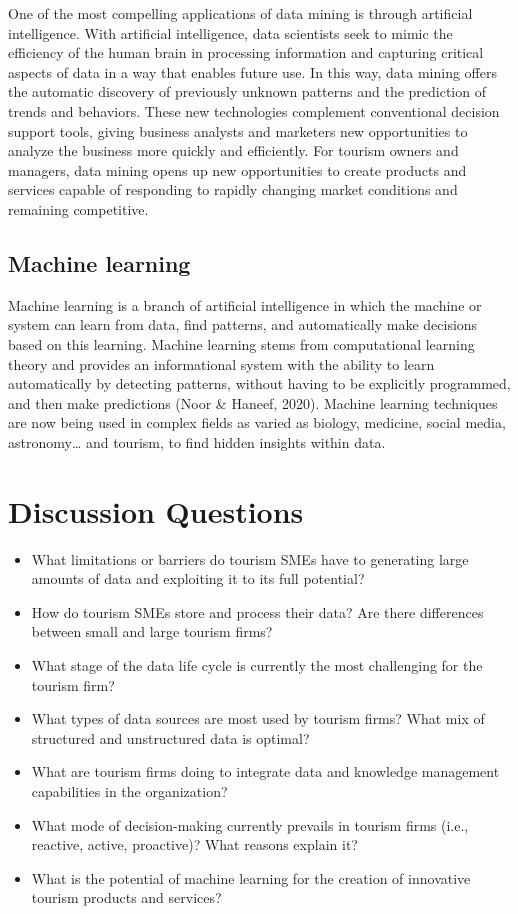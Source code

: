 \documentclass[
  letterpaper,
  DIV=11,
  numbers=noendperiod]{scrreprt}
\begin{document}
One of the most compelling applications of data mining is through
artificial intelligence. With artificial intelligence, data scientists
seek to mimic the efficiency of the human brain in processing
information and capturing critical aspects of data in a way that enables
future use. In this way, data mining offers the automatic discovery of
previously unknown patterns and the prediction of trends and behaviors.
These new technologies complement conventional decision support tools,
giving business analysts and marketers new opportunities to analyze the
business more quickly and efficiently. For tourism owners and managers,
data mining opens up new opportunities to create products and services
capable of responding to rapidly changing market conditions and
remaining competitive.

\hypertarget{machine-learning}{%
\subsection{Machine learning}\label{machine-learning}}

Machine learning is a branch of artificial intelligence in which the
machine or system can learn from data, find patterns, and automatically
make decisions based on this learning. Machine learning stems from
computational learning theory and provides an informational system with
the ability to learn automatically by detecting patterns, without having
to be explicitly programmed, and then make predictions (Noor \& Haneef,
2020). Machine learning techniques are now being used in complex fields
as varied as biology, medicine, social media, astronomy\ldots{} and
tourism, to find hidden insights within data.

\hypertarget{discussion-questions-4}{%
\section{Discussion Questions}\label{discussion-questions-4}}

\begin{itemize}
\item
  What limitations or barriers do tourism SMEs have to generating large
  amounts of data and exploiting it to its full potential?
\item
  How do tourism SMEs store and process their data? Are there
  differences between small and large tourism firms?
\item
  What stage of the data life cycle is currently the most challenging
  for the tourism firm?
\item
  What types of data sources are most used by tourism firms? What mix of
  structured and unstructured data is optimal?
\item
  What are tourism firms doing to integrate data and knowledge
  management capabilities in the organization?
\item
  What mode of decision-making currently prevails in tourism firms
  (i.e., reactive, active, proactive)? What reasons explain it?
\item
  What is the potential of machine learning for the creation of
  innovative tourism products and services?
\end{itemize}
\end{document}
